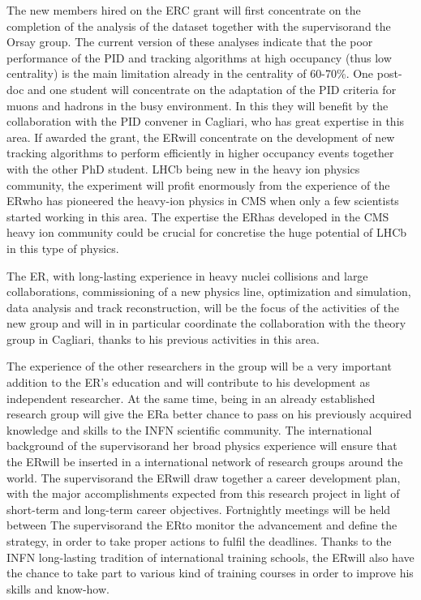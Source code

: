 \documentclass[a4paper,11pt]{article}
\newcommand{\ER}{ER}
\newcommand{\supervisor}{the supervisor}
\newcommand{\Supervisor}{The supervisor}
\begin{document}
The new members hired on the 
ERC grant will 
first concentrate on the completion of the analysis of the 
\PbPb dataset together with \supervisor and the 
Orsay group. The current 
version of these analyses indicate that the 
poor performance of the PID and tracking algorithms at high occupancy 
(thus low centrality) is the main limitation already 
in the centrality of 60-70\%. One post-doc and one student will 
concentrate on the adaptation of the PID criteria
for muons and hadrons in the busy \PbPb environment.
In this they will benefit by the collaboration 
with the PID convener in 
Cagliari, who has great expertise in this area.
If awarded the grant, the \ER will concentrate on the development of 
new tracking algorithms to perform efficiently in higher 
occupancy events together with the other PhD student. LHCb being new in the 
heavy ion physics community, the experiment
will profit enormously from the experience 
of the \ER who has pioneered the heavy-ion physics 
in CMS when only a few scientists started working 
in this area. 
The expertise the \ER has developed in the CMS 
heavy ion community could be crucial for 
concretise the huge potential of LHCb in this 
type of physics. 


The \ER, with long-lasting experience in heavy nuclei
collisions and large collaborations, commissioning
of a new physics line, optimization and simulation, data analysis and track
reconstruction, will be the focus of the activities
of the new group and will in
in particular coordinate the 
collaboration with the 
theory group in Cagliari, thanks to his previous 
activities in this area.


   The experience of the other
researchers in the group will be a very important addition to the \ER's
education and will contribute to his development as independent
researcher. At the same time, being in an already established research
group will give the \ER a better chance to pass on his previously
acquired knowledge and skills to the INFN scientific community. 
The international background of \supervisor and her 
broad physics experience will ensure that the 
\ER will be inserted in a international network of 
research groups around the world.  
\Supervisor and the \ER will draw together a career development plan,
with the major accomplishments expected from this research project in
light of short-term and long-term career objectives. Fortnightly
meetings will be held between \Supervisor and the \ER to monitor the
advancement and define the strategy, in order to take proper actions
to fulfil the deadlines. Thanks to the INFN long-lasting tradition of
international training schools, the \ER will also have the chance to take
part to various kind of training courses in order to improve his
skills and know-how.  
\end{document}
